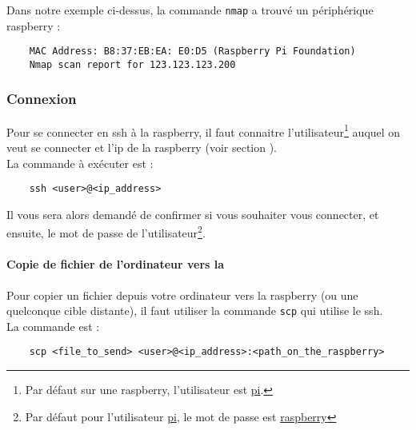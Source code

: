 Dans notre exemple ci-dessus, la commande \texttt{nmap} a trouvé un périphérique \gls{raspberry} :

\begin{verbatim}
    MAC Address: B8:37:EB:EA: E0:D5 (Raspberry Pi Foundation)
    Nmap scan report for 123.123.123.200
\end{verbatim}

\subsubsection{Connexion}

Pour se connecter en \gls{ssh} à la \gls{raspberry}, il faut connaitre l'utilisateur\footnote{Par défaut sur une
    \gls{raspberry}, l'utilisateur est \underline{pi}.} auquel on veut se connecter et l'\gls{ip} de la \gls{raspberry}
(voir section ).\\
La commande à exécuter est :

\begin{verbatim}
    ssh <user>@<ip_address>
\end{verbatim}

Il vous sera alors demandé de confirmer si vous souhaiter vous connecter, et ensuite, le mot de passe de
l'utilisateur\footnote{Par défaut pour l'utilisateur \underline{pi}, le mot de passe est \underline{raspberry}}.

\paragraph{Copie de fichier de l'ordinateur vers la }
\label{sec:copieVersRaspberry}

Pour copier un fichier depuis votre ordinateur vers la \gls{raspberry} (ou une quelconque cible distante), il faut
utiliser la commande \texttt{scp} qui utilise le \gls{ssh}.\\
La commande est :

\begin{verbatim}
    scp <file_to_send> <user>@<ip_address>:<path_on_the_raspberry>
\end{verbatim}

